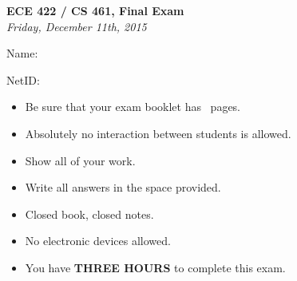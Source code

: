 \documentclass[addpoints]{exam}
\begin{document}
\begin{titlepage}
  \vspace*{\fill}
  \begin{center}
    \Large\textbf{ECE 422 / CS 461, Final Exam}\\
    \large\textit{Friday, December 11th, 2015}\\
  \end{center}
  \vspace{.5in}
  \par\large{Name:}\hrulefill\\
  \par\large{NetID:}\hrulefill\\
  \vspace{.5in}
  \begin{itemize}
  \item Be sure that your exam booklet has \numpages\ pages.
  \item Absolutely no interaction between students is allowed.
  \item Show all of your work.
  \item Write all answers in the space provided.
  \item Closed book, closed notes.
  \item No electronic devices allowed.
  \item You have \textbf{THREE HOURS} to complete this exam.
  \end{itemize}
  \vspace*{\fill}
\end{titlepage}
\newpage 

\begin{center}
  \gradetable[v][pages]
\end{center}
\newpage
\end{document}
